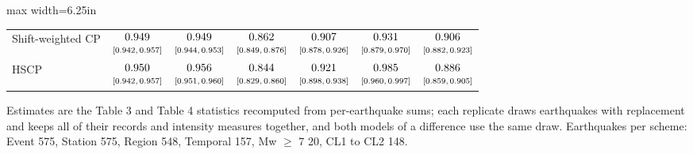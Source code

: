 \begin{table}[htbp]
\begin{adjustbox}{max width=6.25in}
\begin{tabular}{lcccccc}
Shift-weighted CP & $\begin{array}{@{}c@{}}0.949\\[-1pt] \scriptstyle[0.942,\,0.957]\end{array}$ & $\begin{array}{@{}c@{}}0.949\\[-1pt] \scriptstyle[0.944,\,0.953]\end{array}$ & $\begin{array}{@{}c@{}}0.862\\[-1pt] \scriptstyle[0.849,\,0.876]\end{array}$ & $\begin{array}{@{}c@{}}0.907\\[-1pt] \scriptstyle[0.878,\,0.926]\end{array}$ & $\begin{array}{@{}c@{}}0.931\\[-1pt] \scriptstyle[0.879,\,0.970]\end{array}$ & $\begin{array}{@{}c@{}}0.906\\[-1pt] \scriptstyle[0.882,\,0.923]\end{array}$ \\
HSCP & $\begin{array}{@{}c@{}}0.950\\[-1pt] \scriptstyle[0.942,\,0.957]\end{array}$ & $\begin{array}{@{}c@{}}0.956\\[-1pt] \scriptstyle[0.951,\,0.960]\end{array}$ & $\begin{array}{@{}c@{}}0.844\\[-1pt] \scriptstyle[0.829,\,0.860]\end{array}$ & $\begin{array}{@{}c@{}}0.921\\[-1pt] \scriptstyle[0.898,\,0.938]\end{array}$ & $\begin{array}{@{}c@{}}0.985\\[-1pt] \scriptstyle[0.960,\,0.997]\end{array}$ & $\begin{array}{@{}c@{}}0.886\\[-1pt] \scriptstyle[0.859,\,0.905]\end{array}$ \\
\bottomrule
\end{tabular}
\end{adjustbox}
\par\smallskip
\parbox{6.25in}{\footnotesize Estimates are the Table 3 and Table 4 statistics recomputed from per-earthquake sums; each replicate draws earthquakes with replacement and keeps all of their records and intensity measures together, and both models of a difference use the same draw. Earthquakes per scheme: Event 575, Station 575, Region 548, Temporal 157, Mw $\geq$ 7 20, CL1 to CL2 148.}
\end{table}
